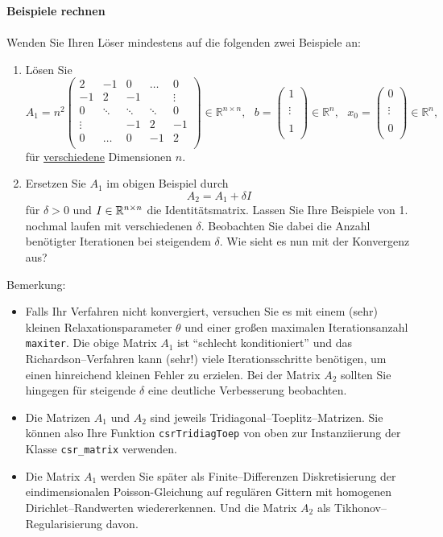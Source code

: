 		 \textbf{Beispiele rechnen}\\
	~\\
	Wenden Sie Ihren Löser \textbf{} mindestens auf die folgenden zwei Beispiele an:
	\begin{enumerate}
		\item Lösen Sie	$$
		A_1 = n^2 \left(\begin{array}{rrrrr}
		2 & -1  &0   & \hdots   & 0 \\
		-1 &  2 & -1  &    &   \vdots \\
		0&  \ddots &  \ddots &\ddots  &0  \\
		\vdots  &    &  -1 &  2 & -1  \\
		0 &   \hdots  & 0& -1  &  2 \\
		\end{array}\right)\in \mathbb{R}^{n \times n},~~~
		b = \left(\begin{array}{rrrrr}
		1 \\
		\\
		\vdots  \\
		\\
		1  \\
		\end{array}\right) \in \mathbb{R}^{n}, ~~~x_0 =  \left(\begin{array}{rrrrr}
		0 \\
		\\
		\vdots  \\
		\\
		0  \\
		\end{array}\right) \in \mathbb{R}^{n},$$ 	für \underline{verschiedene} Dimensionen $n$.
		\item Ersetzen Sie $A_1$ im obigen Beispiel durch
		$$
		A_2 = A_1 + \delta I$$
		für $\delta > 0$ und $I \in {\mathbb{R}}^{n\times n}$ die Identitätsmatrix. Lassen Sie Ihre Beispiele von 1. nochmal laufen mit verschiedenen $\delta$.   Beobachten Sie dabei die Anzahl benötigter Iterationen bei steigendem $\delta$. Wie sieht es nun mit der Konvergenz aus?
	\end{enumerate}
	Bemerkung:\begin{itemize}
		\item  Falls Ihr Verfahren nicht konvergiert, versuchen Sie es mit einem (sehr) kleinen Relaxationsparameter $\theta$ und einer großen maximalen Iterationsanzahl \texttt{maxiter}. Die obige Matrix $A_1$ ist ``schlecht konditioniert'' und das Richardson--Verfahren kann (sehr!) viele Iterationsschritte benötigen, um einen hinreichend kleinen Fehler zu erzielen. Bei der Matrix $A_2$ sollten Sie hingegen für steigende $\delta$ eine deutliche Verbesserung beobachten.
		\item Die Matrizen $A_1$ und $A_2$ sind jeweils Tridiagonal--Toeplitz--Matrizen. Sie können also Ihre Funktion \texttt{csrTridiagToep} von oben zur Instanziierung der Klasse \texttt{csr\_matrix} verwenden.
		\item Die Matrix $A_1$ werden Sie später als Finite--Differenzen Diskretisierung der eindimensionalen Poisson-Gleichung auf regulären Gittern mit homogenen Dirichlet--Randwerten wiedererkennen. Und die Matrix $A_2$ als Tikhonov--Regularisierung davon.
	\end{itemize}
